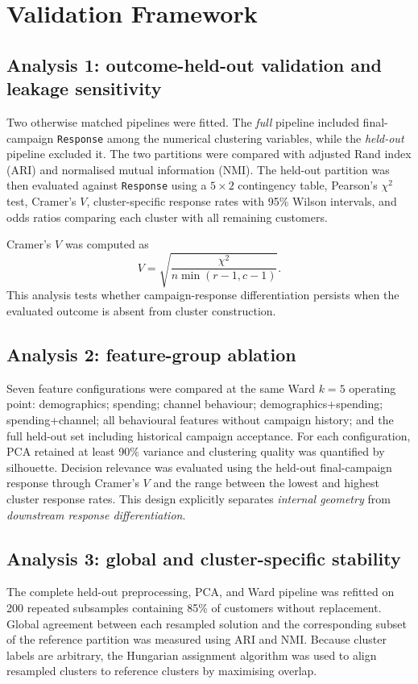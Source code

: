 \documentclass[10pt]{article}
\begin{document}
\section{Validation Framework}
\subsection{Analysis 1: outcome-held-out validation and leakage sensitivity}
Two otherwise matched pipelines were fitted. The \emph{full} pipeline included final-campaign \texttt{Response} among the numerical clustering variables, while the \emph{held-out} pipeline excluded it. The two partitions were compared with adjusted Rand index (ARI) and normalised mutual information (NMI). The held-out partition was then evaluated against \texttt{Response} using a $5\times2$ contingency table, Pearson's $\chi^2$ test, Cramer's $V$, cluster-specific response rates with 95\% Wilson intervals, and odds ratios comparing each cluster with all remaining customers.

Cramer's $V$ was computed as
\begin{equation}
V=\sqrt{\frac{\chi^2}{n\min(r-1,c-1)}}.
\end{equation}
This analysis tests whether campaign-response differentiation persists when the evaluated outcome is absent from cluster construction.

\subsection{Analysis 2: feature-group ablation}
Seven feature configurations were compared at the same Ward $k=5$ operating point: demographics; spending; channel behaviour; demographics+spending; spending+channel; all behavioural features without campaign history; and the full held-out set including historical campaign acceptance. For each configuration, PCA retained at least 90\% variance and clustering quality was quantified by silhouette. Decision relevance was evaluated using the held-out final-campaign response through Cramer's $V$ and the range between the lowest and highest cluster response rates. This design explicitly separates \emph{internal geometry} from \emph{downstream response differentiation}.

\subsection{Analysis 3: global and cluster-specific stability}
The complete held-out preprocessing, PCA, and Ward pipeline was refitted on 200 repeated subsamples containing 85\% of customers without replacement. Global agreement between each resampled solution and the corresponding subset of the reference partition was measured using ARI and NMI. Because cluster labels are arbitrary, the Hungarian assignment algorithm was used to align resampled clusters to reference clusters by maximising overlap.
\end{document}
